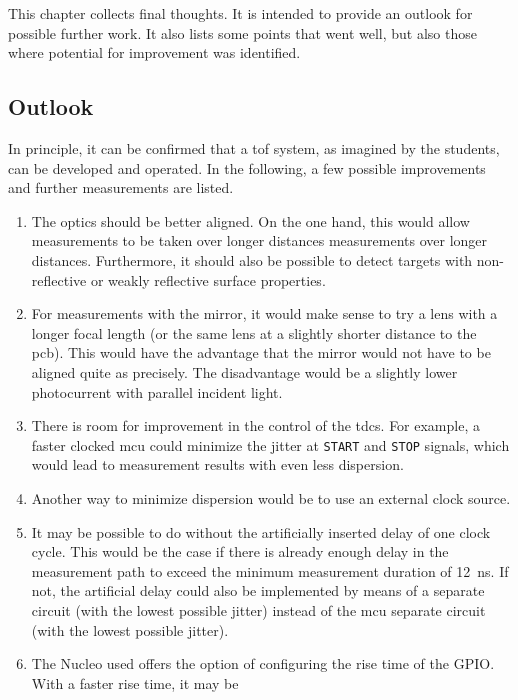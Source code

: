 This chapter collects final thoughts. It is intended to provide an outlook for possible
further work. It also lists some points that went well, but also those where
potential for improvement was identified.

\subsection{Outlook}\label{sec:ausblick}

In principle, it can be confirmed that a \acrshort{tof} system, as imagined by the students,
can be developed and operated. In the following, a few possible improvements and further measurements are
listed.

\begin{enumerate}
      \item The optics should be better aligned. On the one hand, this would allow measurements to be taken over longer
            distances measurements over longer distances. Furthermore, it should also be possible to detect targets with
            non-reflective or weakly reflective surface properties.
      \item For measurements with the mirror, it would make sense to try a lens with a longer focal length (or the same
            lens at a slightly shorter distance to the \acrshort{pcb}). This would have the advantage that the mirror
            would not have to be aligned quite as precisely. The disadvantage would be a slightly lower photocurrent with
            parallel incident light.
      \item There is room for improvement in the control of the \acrshort{tdc}s. For example, a faster clocked
            \acrshort{mcu} could minimize the jitter at \lstinline|START| and \lstinline|STOP| signals, which would lead
            to measurement results with even less dispersion.
      \item Another way to minimize dispersion would be to use an external clock source.
      \item It may be possible to do without the artificially inserted delay of one clock cycle. This would be the case if
            there is already enough delay in the measurement path to exceed the minimum measurement duration of 12~ns.
            If not, the artificial delay could also be implemented by means of a separate circuit (with the lowest possible
            jitter) instead of the \acrshort{mcu} separate circuit (with the lowest possible jitter).
      \item The Nucleo used offers the option of configuring the rise time of the GPIO. With a faster rise time, it may be

\end{enumerate}
